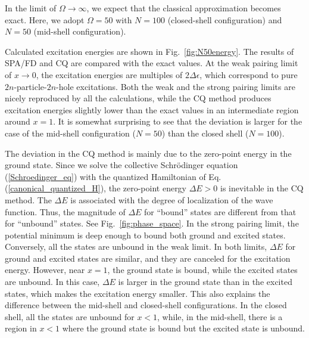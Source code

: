 \documentclass[11pt]{book} %
\begin{document}
In the limit of $\Omega\rightarrow\infty$,
we expect that the classical approximation becomes exact.
Here, we adopt $\Omega=50$ with $N=100$ (closed-shell configuration)
and $N=50$ (mid-shell configuration).

Calculated excitation energies are shown in Fig.~\ref{fig:N50energy}.
The results of SPA/FD and CQ are compared with the exact values.
At the weak pairing limit of $x\rightarrow 0$,
the excitation energies are multiples of $2\Delta\epsilon$, 
which correspond to pure $2n$-particle-$2n$-hole excitations.
Both the weak and the strong pairing limits
are nicely reproduced by all the calculations,
while the CQ method produces excitation energies slightly lower than the
exact values in an intermediate region around $x=1$.
It is somewhat surprising to see that the deviation is larger for
the case of the mid-shell configuration ($N=50$) than the closed shell
($N=100$).

The deviation in the CQ method is mainly due to the zero-point energy
in the ground state.
Since we solve the collective Schr\"odinger equation (\ref{Schroedinger_eq})
with the quantized Hamiltonian of Eq. (\ref{canonical_quantized_H}),
the zero-point energy $\Delta E>0$ is inevitable in the CQ method.
The $\Delta E$ is associated with the degree of localization of
the wave function.
Thus, the magnitude of $\Delta E$ for ``bound'' states are different
from that for ``unbound'' states.
See Fig.~\ref{fig:phase_space}.
In the strong pairing limit, the potential minimum is deep enough to bound
both ground and excited states.
Conversely, all the states are unbound in the weak limit.
In both limits, $\Delta E$ for ground and excited states are similar,
and they are canceled for the excitation energy.
However, near $x=1$, the ground state is bound,
while the excited states are unbound.
In this case, $\Delta E$ is larger in the ground state than in the
excited states, which makes the excitation energy smaller.
This also explains the difference between the mid-shell and closed-shell
configurations.
In the closed shell, all the states are unbound for $x<1$,
while, in the mid-shell,
there is a region in $x<1$ where the ground state is bound but
the excited state is unbound.
\end{document}

